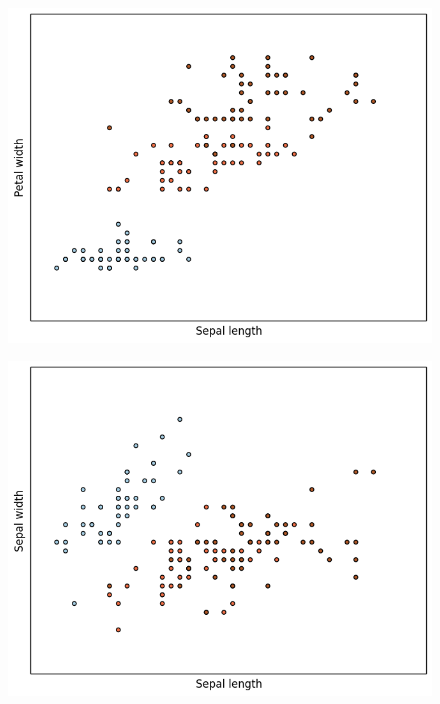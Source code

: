 \documentclass[12pt]{article}
\begin{document}
\begin{figure}[!ht]
\centering
\includegraphics[scale=0.6]{images/sepal_length-petal_width.png}
\end{figure}
\begin{figure}[!ht]
\centering
\includegraphics[scale=0.6]{images/sepal_length-sepal_width.png}
\end{figure}
\end{document}
